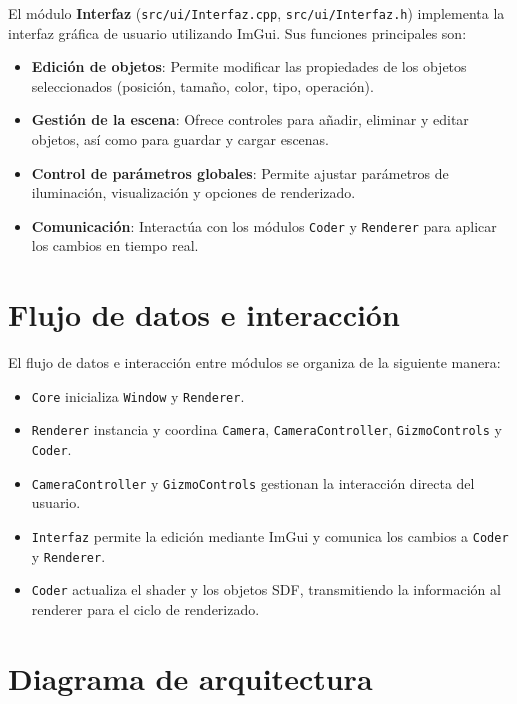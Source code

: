 El módulo \textbf{Interfaz} (\texttt{src/ui/Interfaz.cpp},
\texttt{src/ui/Interfaz.h}) implementa la interfaz gráfica de usuario
utilizando ImGui. Sus funciones principales son:
\begin{itemize}
    \item \textbf{Edición de objetos}: Permite modificar las propiedades de los objetos seleccionados (posición, tamaño, color, tipo, operación).
    \item \textbf{Gestión de la escena}: Ofrece controles para añadir, eliminar y editar objetos, así como para guardar y cargar escenas.
    \item \textbf{Control de parámetros globales}: Permite ajustar parámetros de iluminación, visualización y opciones de renderizado.
    \item \textbf{Comunicación}: Interactúa con los módulos \texttt{Coder} y \texttt{Renderer} para aplicar los cambios en tiempo real.
\end{itemize}

\section{Flujo de datos e interacción}

El flujo de datos e interacción entre módulos se organiza de la siguiente
manera:
\begin{itemize}
    \item \texttt{Core} inicializa \texttt{Window} y \texttt{Renderer}.
    \item \texttt{Renderer} instancia y coordina \texttt{Camera}, \texttt{CameraController}, \texttt{GizmoControls} y \texttt{Coder}.
    \item \texttt{CameraController} y \texttt{GizmoControls} gestionan la interacción directa del usuario.
    \item \texttt{Interfaz} permite la edición mediante ImGui y comunica los cambios a \texttt{Coder} y \texttt{Renderer}.
    \item \texttt{Coder} actualiza el shader y los objetos SDF, transmitiendo la información al renderer para el ciclo de renderizado.
\end{itemize}

\section{Diagrama de arquitectura}


